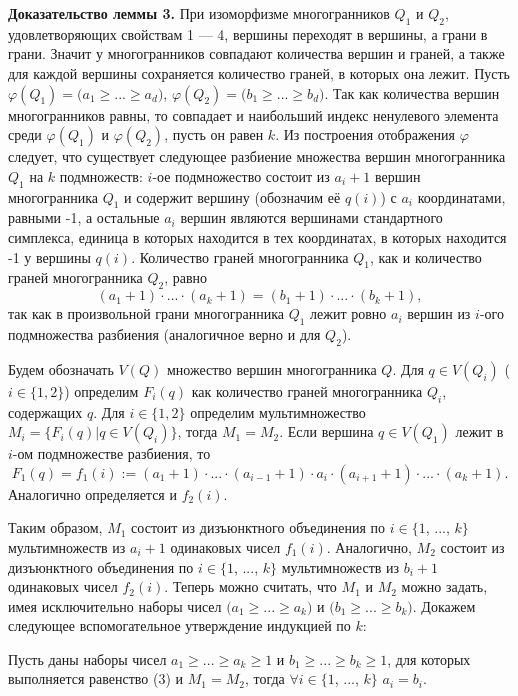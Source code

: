 \documentclass[12pt,notitlepage]{article}
\begin{document}
	\textbf{Доказательство леммы 3.} При изоморфизме многогранников $Q_1$ и $Q_2$, удовлетворяющих свойствам 1 --- 4, вершины переходят в вершины, а грани в грани. Значит у многогранников совпадают количества вершин и граней, а также для каждой вершины сохраняется количество граней, в которых она лежит. Пусть $\varphi(Q_1) = (a_1 \geq$...$\geq a_d)$, $\varphi(Q_2) = (b_1 \geq$...$\geq b_d)$. Так как количества вершин многогранников равны, то совпадает и наибольший индекс ненулевого элемента среди $\varphi(Q_1)$ и $\varphi(Q_2)$, пусть он равен $k$. Из построения отображения $\varphi$ следует, что существует следующее разбиение множества вершин многогранника $Q_1$ на $k$ подмножеств: $i$-ое подмножество состоит из $a_i + 1$ вершин многогранника $Q_1$ и содержит вершину (обозначим её $q(i)$) с $a_i$ координатами, равными -1, а остальные $a_i$ вершин являются вершинами стандартного симплекса, единица в которых находится в тех координатах, в которых находится -1 у вершины $q(i)$. Количество граней многогранника $Q_1$, как и количество граней многогранника $Q_2$, равно
	\[
	(a_1+1)\cdot ... \cdot (a_k+1)=(b_1+1)\cdot ... \cdot (b_k+1), \tag{3} \label{bseeq}
	\]
	так как в произвольной грани многогранника $Q_1$  лежит ровно $a_i$ вершин из $i$-ого подмножества разбиения (аналогичное верно и для $Q_2$).
	
	Будем обозначать $V(Q)$ множество вершин многогранника $Q$. Для $q \in V(Q_i)$ ($i \in \{1, 2\}$) определим $F_i(q)$ как количество граней многогранника $Q_i$, содержащих $q$. Для $i \in \{1, 2\}$ определим мультимножество $M_i = \{F_i(q)| q \in V(Q_i)\}$, тогда $M_1 = M_2$. Если вершина $q \in V(Q_1)$ лежит в $i$-ом подмножестве разбиения, то
	\[
	F_1(q)=f_1(i):=(a_1+1)\cdot ... \cdot (a_{i-1}+1)\cdot a_i\cdot (a_{i+1}+1)\cdot ... \cdot (a_k+1).
	\]
	Аналогично определяется и $f_2(i)$.
	
	Таким образом, $M_1$ состоит из дизъюнктного объединения по $i \in \{1$, ..., $k\}$ мультимножеств из $a_i + 1$ одинаковых чисел $f_1(i)$. Аналогично, $M_2$ состоит из дизъюнктного объединения по $i \in \{1$, ..., $k\}$ мультимножеств из $b_i + 1$ одинаковых чисел $f_2(i)$. Теперь можно считать, что $M_1$ и $M_2$ можно задать, имея исключительно наборы чисел $(a_1 \geq$...$\geq a_k)$ и $(b_1 \geq$...$\geq b_k)$. Докажем следующее вспомогательное утверждение индукцией по $k$:
	
	Пусть даны наборы чисел $a_1 \geq ... \geq a_k \geq 1$ и $b_1 \geq ... \geq b_k \geq 1$, для которых выполняется равенство (3) и $M_1 = M_2$, тогда $\forall i \in \{1$, ..., $k\}$ $a_i=b_i$.
	
\end{document}
